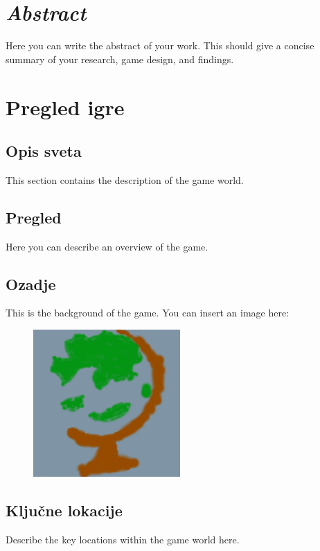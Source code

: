 \documentclass[a4paper,12pt]{article}
\begin{document}
\section*{\textit{Abstract}}

\noindent Here you can write the abstract of your work. This should give a concise summary of your research, game design, and findings.

\newpage

\section{Pregled igre}

\subsection{Opis sveta}
\noindent This section contains the description of the game world.

\subsection{Pregled}
\noindent Here you can describe an overview of the game.

\subsection{Ozadje}
\noindent This is the background of the game. You can insert an image here:

\begin{figure}[h!]
    \centering
    \includegraphics[width=0.5\textwidth]{./slika.png}
\end{figure}

\subsection{Ključne lokacije}
\noindent Describe the key locations within the game world here.
\end{document}
